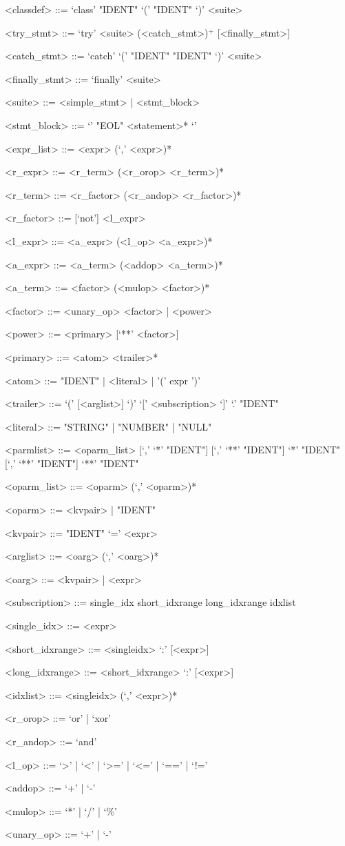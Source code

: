 \documentclass[10pt,a4paper]{article}
\begin{document}
\begin{grammar}
<classdef> ::= `class' "IDENT" `(' "IDENT" `)' <suite>

<try_stmt> ::= `try' <suite> (<catch_stmt>)$^{+}$ [<finally_stmt>]

<catch_stmt> ::= `catch' `(' "IDENT" "IDENT" `)' <suite>

<finally_stmt> ::= `finally' <suite>

<suite> ::= <simple_stmt> | <stmt_block>

<stmt_block> ::= `{' "EOL" <statement>* `}'


<expr_list> ::= <expr> (`,' <expr>)*

<r_expr> ::= <r_term> (<r_orop> <r_term>)*

<r_term> ::= <r_factor> (<r_andop> <r_factor>)*

<r_factor> ::= [`not'] <l_expr>

<l_expr> ::= <a_expr> (<l_op> <a_expr>)*

<a_expr> ::= <a_term> (<addop> <a_term>)*

<a_term> ::= <factor> (<mulop> <factor>)*

<factor> ::= <unary_op> <factor> | <power>

<power> ::= <primary> [`**' <factor>]

<primary> ::= <atom> <trailer>*

<atom> ::= "IDENT" | <literal> | '(' expr ')'

<trailer> ::= `(' [<arglist>] `)' 
	\alt `[' <subscription> `]'
	\alt `.' "IDENT"

<literal> ::= "STRING" | "NUMBER" | "NULL"


<parmlist> ::= <oparm_list> [`,' `*' "IDENT"] [`,' `**' "IDENT"]
    \alt `*' "IDENT" [`,' `**' "IDENT"]
    \alt `**' "IDENT"

<oparm_list> ::= <oparm> (`,' <oparm>)*

<oparm> ::= <kvpair> | "IDENT"

<kvpair> ::= "IDENT" `=' <expr>

<arglist> ::= <oarg> (`,' <oarg>)*

<oarg> ::= <kvpair> | <expr>

<subscription> ::= single_idx 
	\alt short_idxrange 
	\alt long_idxrange 
	\alt idxlist

<single_idx> ::= <expr>

<short_idxrange> ::= <singleidx> `:' [<expr>] 

<long_idxrange> ::= <short_idxrange> `:' [<expr>]

<idxlist> ::= <singleidx> (`,' <expr>)*

<r_orop> ::= `or' | `xor'

<r_andop> ::= `and'

<l_op> ::= `>' | `<' | `>=' | `<=' | `==' | `!='

<addop> ::= `+' | `-'

<mulop> ::= `*' | `/' | `\%'

<unary_op> ::= `+' | `-'

\end{grammar}
\end{document}
